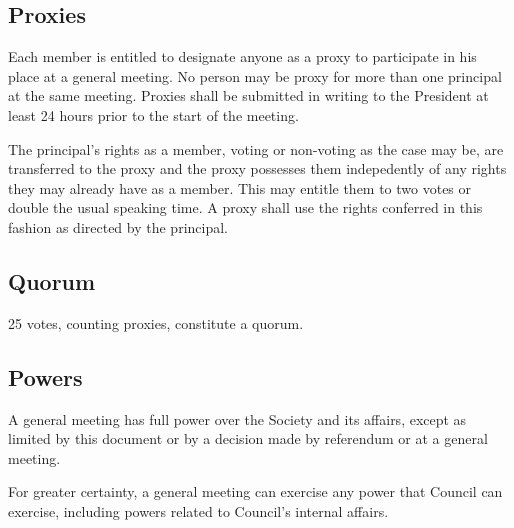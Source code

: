 \subsection{Proxies}
Each member is entitled to designate anyone as a proxy to participate in his
place at a general meeting. No person may be proxy for more than one principal
at the same meeting. Proxies shall be submitted in writing to the President at
least 24 hours prior to the start of the meeting.

The principal's rights as a member, voting or non-voting as the case may be, are
transferred to the proxy and the proxy possesses them indepedently of any rights
they may already have as a member. This may entitle them to two votes or double
the usual speaking time. A proxy shall use the rights conferred in this fashion
as directed by the principal.

\subsection{Quorum}
25 votes, counting proxies, constitute a quorum.

\subsection{Powers}
A general meeting has full power over the Society and its affairs, except as
limited by this document or by a decision made by referendum or at a general
meeting.

For greater certainty, a general meeting can exercise any power that Council can
exercise, including powers related to Council's internal affairs.